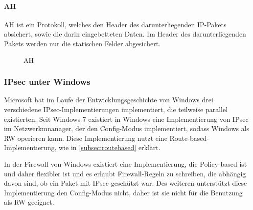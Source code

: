 \paragraph{AH}
\ac{AH} ist ein Protokoll, welches den Header des darunterliegenden \ac{IP}-Pakets absichert,
sowie die darin eingebetteten Daten. Im Header des darunterliegenden Pakets werden nur die statischen Felder
abgesichert.
\begin{figure}
    \label{fig:AH}
    \centering
    \def\svgwidth{\columnwidth}
    
    \caption{\ac{AH}}
\end{figure}

\subsubsection{IPsec unter Windows}
Microsoft hat im Laufe der Entwicklungsgeschichte von Windows drei verschiedene
\ac{IPsec}-Implementierungen implementiert, die teilweise parallel existierten.
Seit Windows 7 existiert in Windows eine Implementierung von \ac{IPsec} im Netzwerkmnanager,
der den Config-Modus implementiert, sodass Windows als \ac{RW} operieren kann.
Diese Implementierung nutzt eine Route-based-Implementierung, wie in \autoref{subsec:routebased}
erklärt.

In der Firewall von Windows existiert eine Implementierung, die Policy-based ist
und daher flexibler ist und es erlaubt Firewall-Regeln zu schreiben, die abhängig davon sind,
ob ein Paket mit \ac{IPsec} geschützt war. Des weiteren unterstützt diese Implementierung
den Config-Modus nicht, daher ist sie nicht für die Benutzung als \ac{RW} geeignet.
